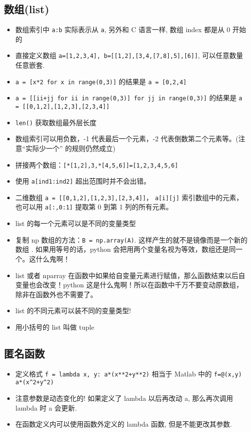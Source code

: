 \subsection{数组(list)}
\begin{itemize}
\item 数组索引中 \verb|a:b| 实际表示从 \verb|a|, 另外和 C 语言一样, 数组 index 都是从 0 开始的
\item 直接定义数组 \verb`a=[1,2,3,4], b=[[1,2],[3,4,[7,8],5],[6]]`, 可以任意数量任意嵌套.
\item \verb`a = [x*2 for x in range(0,3)]` 的结果是 \verb`a = [0,2,4]`
\item \verb`a = [[ii+jj for ii in range(0,3)] for jj in range(0,3)]` 的结果是 \verb`a = [[0,1,2],[1,2,3],[2,3,4]]`
\item \verb`len()` 获取数组最外层长度
\item 数组索引可以用负数，-1 代表最后一个元素，-2 代表倒数第二个元素等。(注意“实际少一个” 的规则仍然成立)
\item 拼接两个数组：\verb`[*[1,2],3,*[4,5,6]]=[1,2,3,4,5,6]`
\item 使用 \verb`a[ind1:ind2]` 超出范围时并不会出错。
\item 二维数组 \verb`a = [[0,1,2],[1,2,3],[2,3,4]]`， \verb`a[i][j]` 索引数组中的元素，也可以用 \verb`a[:,0:1]` 提取第 0 到第 1 列的所有元素。
\item list 的每一个元素可以是不同的变量类型
\item 复制 np 数组的方法：\verb`B = np.array(A)`. 这样产生的就不是镜像而是一个新的数组 . 如果用等号的话，python 会把用两个变量名视为等效，数组还是同一个。这什么鬼啊！
\item list 或者 nparray 在函数中如果给自变量元素进行赋值，那么函数结束以后自变量也会改变！python 这是什么鬼啊！所以在函数中千万不要变动原数组，除非在函数外也不需要了。
\item list 的不同元素可以装不同的变量类型!
\item 用小括号的 list 叫做 tuple
\end{itemize}

\subsection{匿名函数}
\begin{itemize}
\item 定义格式 \verb`f = lambda x, y: a*(x**2+y**2)` 相当于 Matlab 中的 \verb`f=@(x,y) a*(x^2+y^2)`
\item 注意参数是动态变化的! 如果定义了 lambda 以后再改动 a, 那么再次调用 lambda 时 a 会更新.
\item 在函数定义内可以使用函数外定义的 lambda 函数, 但是不能更改其参数.
\end{itemize}

